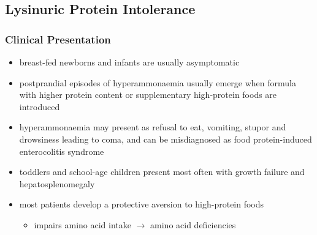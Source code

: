 \documentclass{scrartcl}
\begin{document}
\subsection{Lysinuric Protein Intolerance}
\label{sec:org39cedb7}
\subsubsection{Clinical Presentation}
\label{sec:org32ac8a6}
\begin{itemize}
\item breast-fed newborns and infants are usually
asymptomatic
\item postprandial episodes of hyperammonaemia usually emerge when formula
with higher protein content or supplementary high-protein foods are
introduced
\item hyperammonaemia may present as refusal to eat, vomiting, stupor and
drowsiness leading to coma, and can be misdiagnosed as food
protein-induced enterocolitis syndrome
\item toddlers and school-age children present most often with growth
failure and hepatosplenomegaly
\item most patients develop a protective aversion to high-protein foods
\begin{itemize}
\item impairs amino acid intake \(\to\) amino acid deficiencies
\end{itemize}
\end{itemize}
\end{document}
